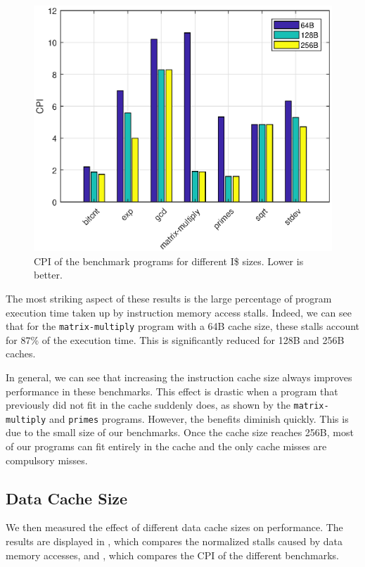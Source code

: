 \documentclass[conference, hidelinks]{IEEEtran}
\begin{document}
\begin{figure}[!htb]
  \centering
  \includegraphics[width=0.775\columnwidth]{plots/instruction_cache_cpi.eps}
  \caption{CPI of the benchmark programs for different I\$ sizes. Lower is better.}
  \label{fig:instruction_cache_cpi}
\end{figure}

The most striking aspect of these results is the large percentage of program execution time taken up by instruction memory access stalls. Indeed, we can see that for the \texttt{matrix-multiply} program with a 64B cache size, these stalls account for 87\% of the execution time. This is significantly reduced for 128B and 256B caches.

In general, we can see that increasing the instruction cache size always improves performance in these benchmarks. This effect is drastic when a program that previously did not fit in the cache suddenly does, as shown by the \texttt{matrix-multiply} and \texttt{primes} programs. However, the benefits diminish quickly. This is due to the small size of our benchmarks. Once the cache size reaches 256B, most of our programs can fit entirely in the cache and the only cache misses are compulsory misses.

\subsection{Data Cache Size}

We then measured the effect of different data cache sizes on performance. The results are displayed in , which compares the normalized stalls caused by data memory accesses, and , which compares the CPI of the different benchmarks.
\end{document}
